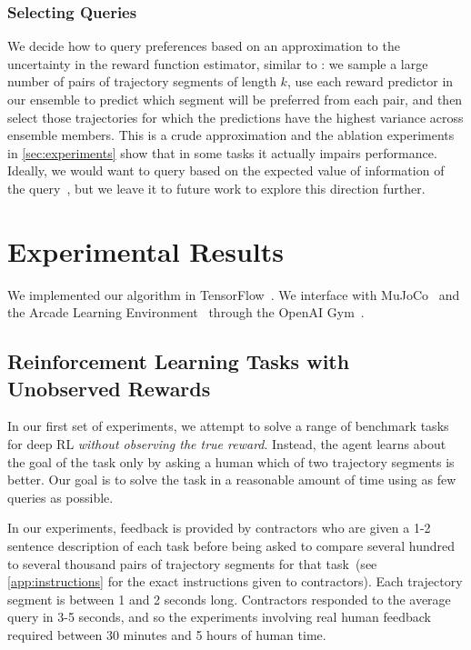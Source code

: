 \subsubsection{Selecting Queries}  
\label{sssec:selecting}

We decide how to query preferences based on an approximation to the uncertainty in the reward function estimator, similar to \citet{Daniel14}:
we sample a large number of pairs of trajectory segments of length $k$, use each reward predictor in our ensemble to predict which segment will be preferred from each pair, and then select those trajectories for which the predictions have the highest variance across ensemble members. This is a crude approximation and the ablation experiments in \autoref{sec:experiments} show that in some tasks it actually impairs performance. Ideally, we would want to query based on the expected value of information of the query~\citep{Akrour12,Krueger16}, but we leave it to future work to explore this direction further.

\section{Experimental Results}
\label{sec:experiments}

We implemented our algorithm in TensorFlow~\citep{Abadi16}. We interface with MuJoCo~\citep{Todorov12} and the Arcade Learning Environment~\citep{Bellemare13} through the OpenAI Gym~\citep{Brockman16}.

\subsection{Reinforcement Learning Tasks with Unobserved Rewards}

In our first set of experiments, we attempt to solve a range of benchmark tasks for deep RL \emph{without observing the true reward}. Instead, the agent learns about the goal of the task only by asking a human which of two trajectory segments is better. Our goal is to solve the task in a reasonable amount of time using as few queries as possible.

In our experiments, feedback is provided by contractors who are given a 1-2 sentence description of each task before being asked to compare several hundred to several thousand pairs of trajectory segments for that task~(see \autoref{app:instructions} for the exact instructions given to contractors). Each trajectory segment is between 1 and 2 seconds long. Contractors responded to the average query in 3-5 seconds, and so the experiments involving real human feedback required between 30 minutes and 5 hours of human time.


